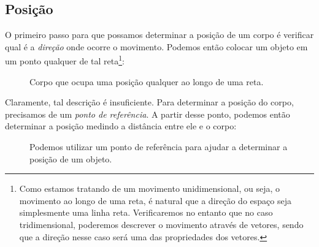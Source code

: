 \subsection{Posição}

O primeiro passo para que possamos determinar a posição de um corpo  é verificar qual é a \emph{direção} onde ocorre o movimento. Podemos então colocar um objeto em um ponto qualquer de tal reta\footnote[][-3cm]{Como estamos tratando de um movimento unidimensional, ou seja, o movimento ao longo de uma reta, é natural que a direção do espaço seja simplesmente uma linha reta. Verificaremos no entanto que no caso tridimensional, poderemos descrever o movimento através de vetores, sendo que a direção nesse caso será uma das propriedades dos vetores.}:

\begin{figure}
\centering
{}
\caption{Corpo que ocupa uma posição qualquer ao longo de uma reta.}
\end{figure}

\noindent{}Claramente, tal descrição é insuficiente. Para determinar a posição do corpo, precisamos de um \emph{ponto de referência}. A partir desse ponto, podemos então determinar a posição medindo a distância entre ele e o corpo:

\begin{figure}
\centering
{}
\caption{Podemos utilizar um ponto de referência para ajudar a determinar a posição de um objeto.}
\end{figure}

